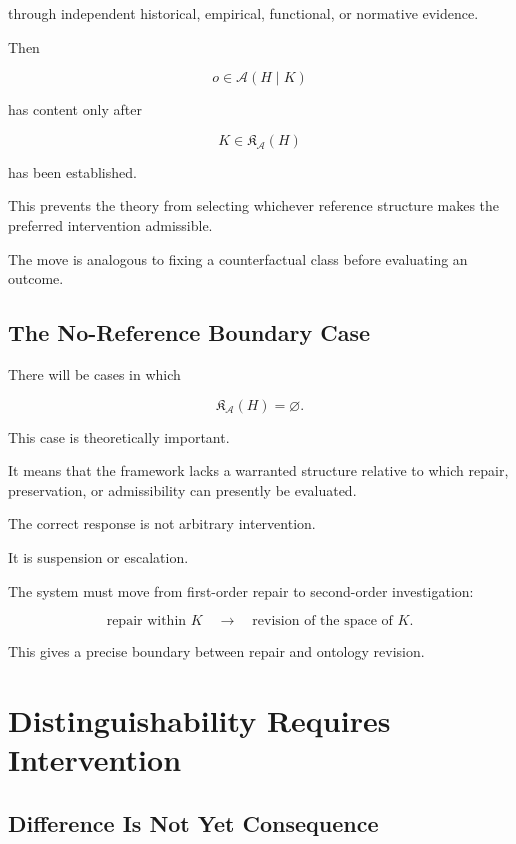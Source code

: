 \documentclass[11pt]{article}
\theoremstyle{remark}
\newcommand{\Adm}{\mathcal{A}}
\begin{document}
through independent historical, empirical, functional, or normative evidence.

Then

\begin{equation}
o\in\Adm(H\mid K)
\end{equation}

has content only after

\begin{equation}
K\in\mathfrak{K}_{\Adm}(H)
\end{equation}

has been established.

This prevents the theory from selecting whichever reference structure makes the preferred intervention admissible.

The move is analogous to fixing a counterfactual class before evaluating an outcome.

\subsection{The No-Reference Boundary Case}

There will be cases in which

\begin{equation}
\mathfrak{K}_{\Adm}(H)=\varnothing.
\end{equation}

This case is theoretically important.

It means that the framework lacks a warranted structure relative to which repair, preservation, or admissibility can presently be evaluated.

The correct response is not arbitrary intervention.

It is suspension or escalation.

The system must move from first-order repair to second-order investigation:

\begin{equation}
\text{repair within }K
\quad\longrightarrow\quad
\text{revision of the space of }K.
\end{equation}

This gives a precise boundary between repair and ontology revision.

\section{Distinguishability Requires Intervention}

\subsection{Difference Is Not Yet Consequence}
\end{document}
